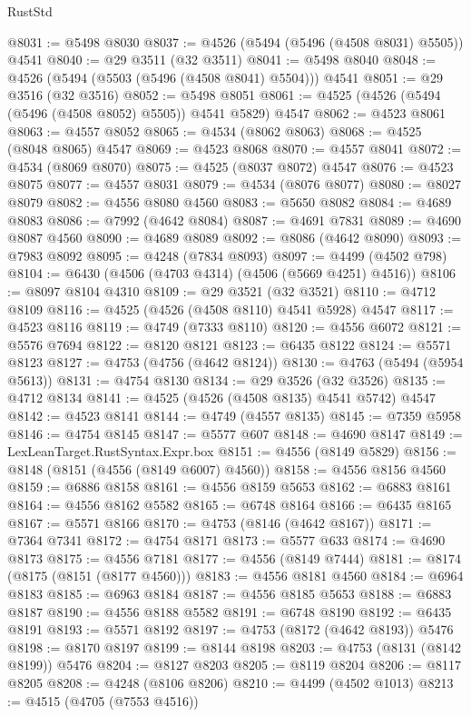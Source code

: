\begin{lexlean}{RustStd}
\begin{coremodule}
@8031 := @5498 @8030
@8037 := @4526 (@5494 (@5496 (@4508 @8031) @5505)) @4541
@8040 := @29 @3511 (@32 @3511)
@8041 := @5498 @8040
@8048 := @4526 (@5494 (@5503 (@5496 (@4508 @8041) @5504))) @4541
@8051 := @29 @3516 (@32 @3516)
@8052 := @5498 @8051
@8061 := @4525 (@4526 (@5494 (@5496 (@4508 @8052) @5505)) @4541 @5829) @4547
@8062 := @4523 @8061
@8063 := @4557 @8052
@8065 := @4534 (@8062 @8063)
@8068 := @4525 (@8048 @8065) @4547
@8069 := @4523 @8068
@8070 := @4557 @8041
@8072 := @4534 (@8069 @8070)
@8075 := @4525 (@8037 @8072) @4547
@8076 := @4523 @8075
@8077 := @4557 @8031
@8079 := @4534 (@8076 @8077)
@8080 := @8027 @8079
@8082 := @4556 @8080 @4560
@8083 := @5650 @8082
@8084 := @4689 @8083
@8086 := @7992 (@4642 @8084)
@8087 := @4691 @7831
@8089 := @4690 @8087 @4560
@8090 := @4689 @8089
@8092 := @8086 (@4642 @8090)
@8093 := @7983 @8092
@8095 := @4248 (@7834 @8093)
@8097 := @4499 (@4502 @798)
@8104 := @6430 (@4506 (@4703 @4314) (@4506 (@5669 @4251) @4516))
@8106 := @8097 @8104 @4310
@8109 := @29 @3521 (@32 @3521)
@8110 := @4712 @8109
@8116 := @4525 (@4526 (@4508 @8110) @4541 @5928) @4547
@8117 := @4523 @8116
@8119 := @4749 (@7333 @8110)
@8120 := @4556 @6072
@8121 := @5576 @7694
@8122 := @8120 @8121
@8123 := @6435 @8122
@8124 := @5571 @8123
@8127 := @4753 (@4756 (@4642 @8124))
@8130 := @4763 (@5494 (@5954 @5613))
@8131 := @4754 @8130
@8134 := @29 @3526 (@32 @3526)
@8135 := @4712 @8134
@8141 := @4525 (@4526 (@4508 @8135) @4541 @5742) @4547
@8142 := @4523 @8141
@8144 := @4749 (@4557 @8135)
@8145 := @7359 @5958
@8146 := @4754 @8145
@8147 := @5577 @607
@8148 := @4690 @8147
@8149 := LexLeanTarget.RustSyntax.Expr.box
@8151 := @4556 (@8149 @5829)
@8156 := @8148 (@8151 (@4556 (@8149 @6007) @4560))
@8158 := @4556 @8156 @4560
@8159 := @6886 @8158
@8161 := @4556 @8159 @5653
@8162 := @6883 @8161
@8164 := @4556 @8162 @5582
@8165 := @6748 @8164
@8166 := @6435 @8165
@8167 := @5571 @8166
@8170 := @4753 (@8146 (@4642 @8167))
@8171 := @7364 @7341
@8172 := @4754 @8171
@8173 := @5577 @633
@8174 := @4690 @8173
@8175 := @4556 @7181
@8177 := @4556 (@8149 @7444)
@8181 := @8174 (@8175 (@8151 (@8177 @4560)))
@8183 := @4556 @8181 @4560
@8184 := @6964 @8183
@8185 := @6963 @8184
@8187 := @4556 @8185 @5653
@8188 := @6883 @8187
@8190 := @4556 @8188 @5582
@8191 := @6748 @8190
@8192 := @6435 @8191
@8193 := @5571 @8192
@8197 := @4753 (@8172 (@4642 @8193)) @5476
@8198 := @8170 @8197
@8199 := @8144 @8198
@8203 := @4753 (@8131 (@8142 @8199)) @5476
@8204 := @8127 @8203
@8205 := @8119 @8204
@8206 := @8117 @8205
@8208 := @4248 (@8106 @8206)
@8210 := @4499 (@4502 @1013)
@8213 := @4515 (@4705 (@7553 @4516))

\end{coremodule}
\end{lexlean}
